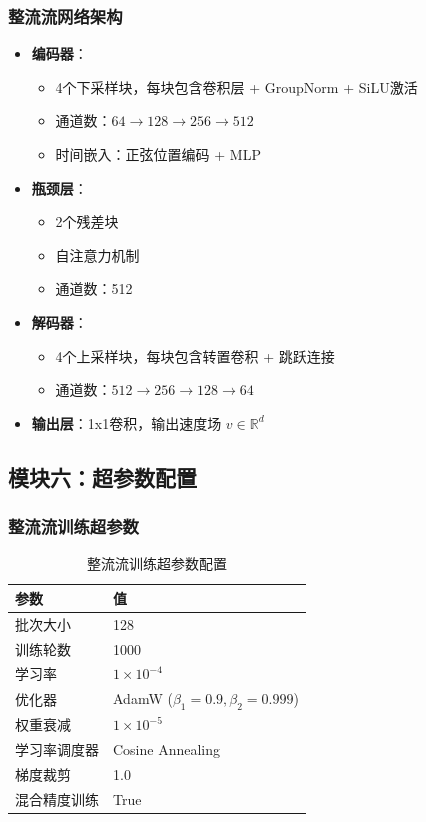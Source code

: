 \documentclass[12pt, a4paper]{article}
\begin{document}
\subsubsection{整流流网络架构}
\begin{itemize}
    \item \textbf{编码器}：
        \begin{itemize}
            \item 4个下采样块，每块包含卷积层 + GroupNorm + SiLU激活
            \item 通道数：$64 \rightarrow 128 \rightarrow 256 \rightarrow 512$
            \item 时间嵌入：正弦位置编码 + MLP
        \end{itemize}
    \item \textbf{瓶颈层}：
        \begin{itemize}
            \item 2个残差块
            \item 自注意力机制
            \item 通道数：512
        \end{itemize}
    \item \textbf{解码器}：
        \begin{itemize}
            \item 4个上采样块，每块包含转置卷积 + 跳跃连接
            \item 通道数：$512 \rightarrow 256 \rightarrow 128 \rightarrow 64$
        \end{itemize}
    \item \textbf{输出层}：1x1卷积，输出速度场 $v \in \mathbb{R}^d$
\end{itemize}

\subsection{模块六：超参数配置}

\subsubsection{整流流训练超参数}
\begin{table}[H]
\centering
\caption{整流流训练超参数配置}
\begin{tabular}{ll}
\toprule
参数 & 值 \\
\midrule
批次大小 & 128 \\
训练轮数 & 1000 \\
学习率 & $1 \times 10^{-4}$ \\
优化器 & AdamW ($\beta_1=0.9, \beta_2=0.999$) \\
权重衰减 & $1 \times 10^{-5}$ \\
学习率调度器 & Cosine Annealing \\
梯度裁剪 & 1.0 \\
混合精度训练 & True \\
\bottomrule
\end{tabular}
\end{table}
\end{document}
